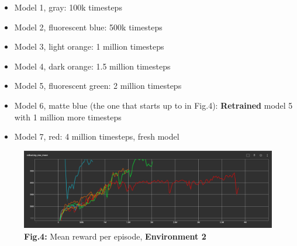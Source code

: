 \documentclass{article}
\numberwithin{equation}{section}
\numberwithin{equation}{section}
\begin{document}
\begin{itemize}
\item Model 1, gray: 100k timesteps
\item Model 2, fluorescent blue: 500k timesteps
\item Model 3, light orange: 1 million timesteps
\item Model 4, dark orange: 1.5 million timesteps
\item Model 5, fluorescent green: 2 million timesteps
\item Model 6, matte blue (the one that starts up to in Fig.4): \textbf{Retrained} model 5 with 1 million more timesteps
\item Model 7, red: 4 million timesteps, fresh model

\end{itemize}




\begin{figure}[H]
	\centering
\includegraphics[scale=3,width=\linewidth]{ep_rew_mean_env2.png}
	\\	
	\vspace{0.1in}
	\textbf{Fig.4:} Mean reward per episode, \textbf{Environment 2}
	\\
	\label{fig:Fig.3}
\end{figure}
\end{document}
